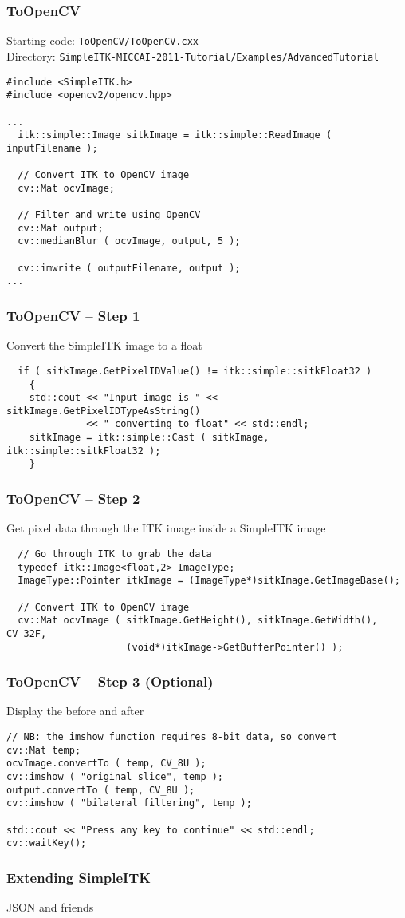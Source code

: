 \begin{frame}[fragile]
\frametitle{ToOpenCV}
Starting code: \texttt{ToOpenCV/ToOpenCV.cxx}\\
Directory: \texttt{SimpleITK-MICCAI-2011-Tutorial/Examples/AdvancedTutorial}
\begin{lstlisting}
#include <SimpleITK.h>
#include <opencv2/opencv.hpp>

...
  itk::simple::Image sitkImage = itk::simple::ReadImage ( inputFilename );

  // Convert ITK to OpenCV image
  cv::Mat ocvImage;

  // Filter and write using OpenCV
  cv::Mat output;
  cv::medianBlur ( ocvImage, output, 5 );

  cv::imwrite ( outputFilename, output );
...
\end{lstlisting}
\end{frame}

\begin{frame}[fragile]
\frametitle{ToOpenCV -- Step 1}
Convert the SimpleITK image to a float
\begin{lstlisting}
  if ( sitkImage.GetPixelIDValue() != itk::simple::sitkFloat32 )
    {
    std::cout << "Input image is " << sitkImage.GetPixelIDTypeAsString()
              << " converting to float" << std::endl;
    sitkImage = itk::simple::Cast ( sitkImage, itk::simple::sitkFloat32 );
    }
\end{lstlisting}
\end{frame}

\begin{frame}[fragile]
\frametitle{ToOpenCV -- Step 2}
Get pixel data through the ITK image inside a SimpleITK image
\begin{lstlisting}
  // Go through ITK to grab the data
  typedef itk::Image<float,2> ImageType;
  ImageType::Pointer itkImage = (ImageType*)sitkImage.GetImageBase();

  // Convert ITK to OpenCV image
  cv::Mat ocvImage ( sitkImage.GetHeight(), sitkImage.GetWidth(), CV_32F,
                     (void*)itkImage->GetBufferPointer() );
\end{lstlisting}
\end{frame}

\begin{frame}[fragile]
\frametitle{ToOpenCV -- Step 3 (Optional)}
Display the before and after
\lstcppa
\begin{lstlisting}
// NB: the imshow function requires 8-bit data, so convert
cv::Mat temp;
ocvImage.convertTo ( temp, CV_8U );
cv::imshow ( "original slice", temp );
output.convertTo ( temp, CV_8U );
cv::imshow ( "bilateral filtering", temp );

std::cout << "Press any key to continue" << std::endl;
cv::waitKey();
\end{lstlisting}
\end{frame}

\begin{frame}
\frametitle{Extending SimpleITK}
JSON and friends
\end{frame}
